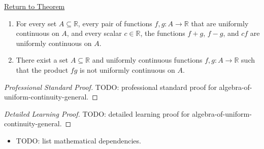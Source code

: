 \newpage
{}
\label{prf:algebra-of-uniform-continuity-general}

\begin{remark*}[Return]
\hyperref[thm:algebra-of-uniform-continuity-general]{Return to Theorem}
\end{remark*}

\begin{theorem*}
\begin{enumerate}[label=(\alph*)]
  \item For every set $A \subseteq \mathbb{R}$, every pair of functions $f,g : A \to \mathbb{R}$ that are uniformly continuous on $A$, and every scalar $c \in \mathbb{R}$, the functions $f+g$, $f-g$, and $cf$ are uniformly continuous on $A$.
  \item There exist a set $A \subseteq \mathbb{R}$ and uniformly continuous functions $f,g : A \to \mathbb{R}$ such that the product $fg$ is not uniformly continuous on $A$.
\end{enumerate}
\end{theorem*}

\begin{proof}[Professional Standard Proof]
\LRAProofBodyStart
TODO: professional standard proof for algebra-of-uniform-continuity-general.
\end{proof}

\begin{proof}[Detailed Learning Proof]
\LRAProofBodyStart
TODO: detailed learning proof for algebra-of-uniform-continuity-general.
\end{proof}

\begin{remark*}
\end{remark*}

\begin{dependencies}
\begin{itemize}
  \item TODO: list mathematical dependencies.
\end{itemize}
\end{dependencies}

\clearpage
